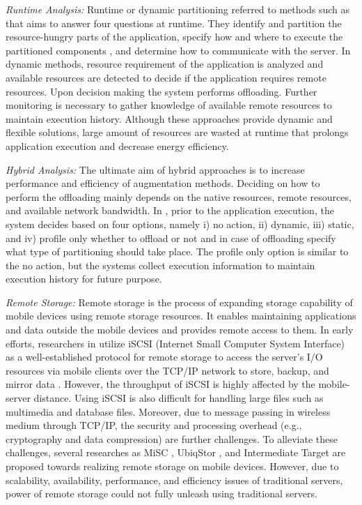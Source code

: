 \documentclass[publish]{IEEEtran}
\begin{document}
\textit{Runtime Analysis:} Runtime or dynamic partitioning referred to methods such as \cite{cuervo2010maui,Abebe2012} that aims to answer four questions at runtime. They identify and partition the resource-hungry parts of the application, specify how and where to execute the partitioned components \cite{Salehie2009,Murarasu2009}, and determine how to communicate with the server. In dynamic methods, resource requirement of the application is analyzed and available resources are detected to decide if the application requires remote resources. Upon decision making the system performs offloading. Further monitoring is necessary to gather knowledge of available remote resources to maintain execution history. Although these approaches provide dynamic and flexible solutions, large amount of resources are wasted at runtime that prolongs application execution and decrease energy efficiency.

\textit{Hybrid Analysis:} The ultimate aim of hybrid approaches \cite{Huerta-Canepa2008} is to increase performance and efficiency of augmentation methods. Deciding on how to perform the offloading mainly depends on the native resources, remote resources, and available network bandwidth. In \cite{Huerta-Canepa2008}, prior to the application execution, the system decides based on four options, namely i) no action, ii) dynamic, iii) static, and iv) profile only whether to offload or not and in case of offloading specify what type of partitioning should take place. The profile only option is similar to the no action, but the systems collect execution information to maintain execution history for future purpose.

\textbullet\textit{ Remote Storage:} Remote storage is the process of expanding storage capability of mobile devices using remote storage resources. It enables maintaining applications and data outside the mobile devices and provides remote access to them. In early efforts, researchers in \cite{Park2003} utilize iSCSI (Internet Small Computer System Interface) \cite{Schmidt1997} \textemdash as a well-established protocol for remote storage \textemdash to access the server's I/O resources via mobile clients over the TCP/IP network to store, backup, and mirror data \cite{Lu2003}. However, the throughput of iSCSI is highly affected by the mobile-server distance. Using iSCSI is also difficult for handling large files such as multimedia and database files. Moreover, due to message passing in wireless medium through TCP/IP, the security and processing overhead (e.g., cryptography and data compression) are further challenges. To alleviate these challenges, several researches as MiSC \cite{Kim2005b}, UbiqStor \cite{Ok2006,Ok2005}, and Intermediate Target \cite{Kim2005} are proposed towards realizing remote storage on mobile devices. However, due to scalability, availability, performance, and efficiency issues of traditional servers, power of remote storage could not fully unleash using traditional servers. 
\end{document}
